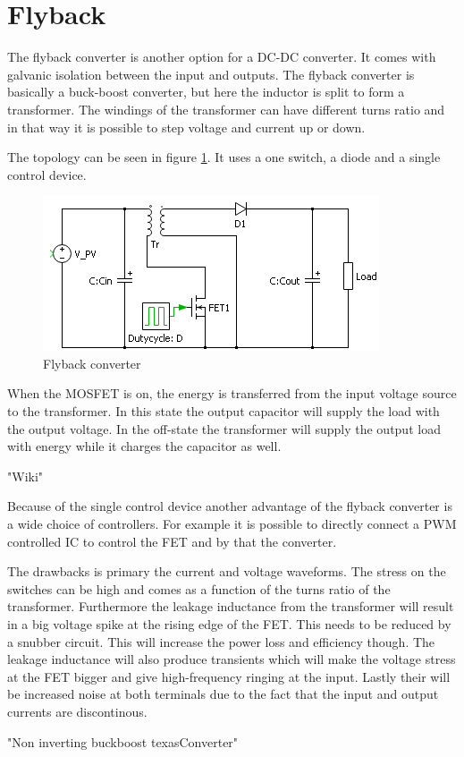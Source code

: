 \section{Flyback}

The flyback converter is another option for a DC-DC converter. It comes with galvanic isolation between the input and outputs. The flyback converter is basically a buck-boost converter, but here the inductor is split to form a transformer. The windings of the transformer can have different turns ratio and in that way it is possible to step voltage and current up or down. 

The topology can be seen in figure \ref{Flyback_SCHEMATIC}. It uses a one switch, a diode and a single control device.    

\begin{figure}
	\includegraphics[width=\linewidth]{../Pictures/flyback_schem.png}
	\caption{Flyback converter}
	\label{Flyback_SCHEMATIC}
\end{figure}

When the MOSFET is on, the energy is transferred from the input voltage source to the transformer. In this state the output capacitor will supply the load with the output voltage. In the off-state the transformer will supply the output load with energy while it charges the capacitor as well.

"Wiki" 

Because of the single control device another advantage of the flyback converter is a wide choice of controllers. For example it is possible to directly connect a PWM controlled IC to control the FET and by that the converter. 

The drawbacks is primary the current and voltage waveforms. The stress on the switches can be high and comes as a function of the turns ratio of the transformer. Furthermore the leakage inductance from the transformer will result in a big voltage spike at the rising edge of the FET. This needs to be reduced by a snubber circuit. This will increase the power loss and efficiency though. The leakage inductance will also produce transients which will make the voltage stress at the FET bigger and give high-frequency ringing at the input. Lastly their will be increased noise at both terminals due to the fact that the input and output currents are discontinous. 

"Non inverting buckboost texasConverter"
